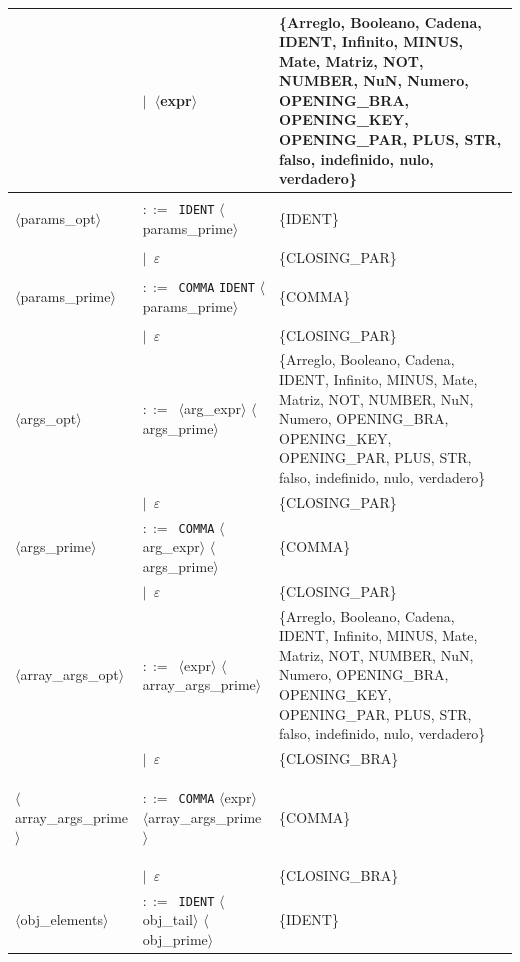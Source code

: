 \documentclass[10pt]{article}
\begin{document}
{\begin{longtable}{@{} p{2.0cm} p{6.9cm} p{6.9cm} @{}}
   & $\mid$~$\langle$expr$\rangle$ & \{Arreglo, Booleano, Cadena, IDENT, Infinito, MINUS, Mate, Matriz, NOT, NUMBER, NuN, Numero, OPENING\_BRA, OPENING\_KEY, OPENING\_PAR, PLUS, STR, falso, indefinido, nulo, verdadero\} \\
  \midrule
  \textcolor{ntcolor}{\parbox[t]{1.8cm}{\raggedright$\langle$params\_\allowbreak{}opt$\rangle$}} & $::=$~\texttt{IDENT} $\langle$params\_prime$\rangle$ & \{IDENT\} \\
   & $\mid$~$\varepsilon$ & \{CLOSING\_PAR\} \\
  \midrule
  \textcolor{ntcolor}{\parbox[t]{1.8cm}{\raggedright$\langle$params\_\allowbreak{}prime$\rangle$}} & $::=$~\texttt{COMMA} \texttt{IDENT} $\langle$params\_prime$\rangle$ & \{COMMA\} \\
   & $\mid$~$\varepsilon$ & \{CLOSING\_PAR\} \\
  \midrule
  \textcolor{ntcolor}{\parbox[t]{1.8cm}{\raggedright$\langle$args\_\allowbreak{}opt$\rangle$}} & $::=$~$\langle$arg\_expr$\rangle$ $\langle$args\_prime$\rangle$ & \{Arreglo, Booleano, Cadena, IDENT, Infinito, MINUS, Mate, Matriz, NOT, NUMBER, NuN, Numero, OPENING\_BRA, OPENING\_KEY, OPENING\_PAR, PLUS, STR, falso, indefinido, nulo, verdadero\} \\
   & $\mid$~$\varepsilon$ & \{CLOSING\_PAR\} \\
  \midrule
  \textcolor{ntcolor}{\parbox[t]{1.8cm}{\raggedright$\langle$args\_\allowbreak{}prime$\rangle$}} & $::=$~\texttt{COMMA} $\langle$arg\_expr$\rangle$ $\langle$args\_prime$\rangle$ & \{COMMA\} \\
   & $\mid$~$\varepsilon$ & \{CLOSING\_PAR\} \\
  \midrule
  \textcolor{ntcolor}{\parbox[t]{1.8cm}{\raggedright$\langle$array\_\allowbreak{}args\_\allowbreak{}opt$\rangle$}} & $::=$~$\langle$expr$\rangle$ $\langle$array\_args\_prime$\rangle$ & \{Arreglo, Booleano, Cadena, IDENT, Infinito, MINUS, Mate, Matriz, NOT, NUMBER, NuN, Numero, OPENING\_BRA, OPENING\_KEY, OPENING\_PAR, PLUS, STR, falso, indefinido, nulo, verdadero\} \\
   & $\mid$~$\varepsilon$ & \{CLOSING\_BRA\} \\
  \midrule
  \textcolor{ntcolor}{\parbox[t]{1.8cm}{\raggedright$\langle$array\_\allowbreak{}args\_\allowbreak{}prime$\rangle$}} & $::=$~\texttt{COMMA} $\langle$expr$\rangle$ $\langle$array\_args\_prime$\rangle$ & \{COMMA\} \\
   & $\mid$~$\varepsilon$ & \{CLOSING\_BRA\} \\
  \midrule
  \textcolor{ntcolor}{\parbox[t]{1.8cm}{\raggedright$\langle$obj\_\allowbreak{}elements$\rangle$}} & $::=$~\texttt{IDENT} $\langle$obj\_tail$\rangle$ $\langle$obj\_prime$\rangle$ & \{IDENT\} \\

\end{longtable}}
\end{document}
